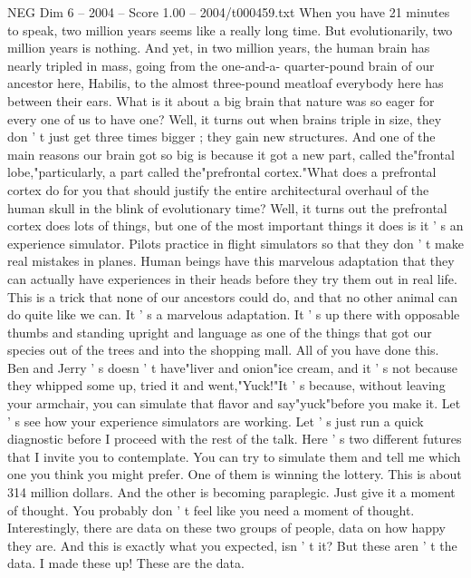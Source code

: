 \begin{textsample}{NEG Dim 6 – 2004 – Score 1.00 – 2004/t000459.txt}  \label{ex:f6_neg_052}
When you have 21 minutes to speak, two million years seems like a really long time.
But evolutionarily, two million years is nothing.
And yet, in two million years, the human brain has nearly tripled in mass, going from the one-and-a- quarter-pound brain of our ancestor here, Habilis, to the almost three-pound meatloaf everybody here has between their ears.
What is it about a big brain that nature was so eager for every one of us to have one?
Well, it turns out when brains triple in size, they don ' t just get three times bigger ; they gain new structures.
And one of the main reasons our brain got so big is because it got a new part, called the"frontal lobe,"particularly, a part called the"prefrontal cortex."What does a prefrontal cortex do for you that should justify the entire architectural overhaul of the human skull in the blink of evolutionary time?
Well, it turns out the prefrontal cortex does lots of things, but one of the most important things it does is it ' s an experience simulator.
Pilots practice in flight simulators so that they don ' t make real mistakes in planes.
Human beings have this marvelous adaptation that they can actually have experiences in their heads before they try them out in real life.
This is a trick that none of our ancestors could do, and that no other animal can do quite like we can.
It ' s a marvelous adaptation.
It ' s up there with opposable thumbs and standing upright and language as one of the things that got our species out of the trees and into the shopping mall.
All of you have done this.
Ben and Jerry ' s doesn ' t have"liver and onion"ice cream, and it ' s not because they whipped some up, tried it and went,"Yuck!"It ' s because, without leaving your armchair, you can simulate that flavor and say"yuck"before you make it.
Let ' s see how your experience simulators are working.
Let ' s just run a quick diagnostic before I proceed with the rest of the talk.
Here ' s two different futures that I invite you to contemplate.
You can try to simulate them and tell me which one you think you might prefer.
One of them is winning the lottery.
This is about 314 million dollars.
And the other is becoming paraplegic.
Just give it a moment of thought.
You probably don ' t feel like you need a moment of thought.
Interestingly, there are data on these two groups of people, data on how happy they are.
And this is exactly what you expected, isn ' t it?
But these aren ' t the data.
I made these up!
These are the data.

\end{textsample}
